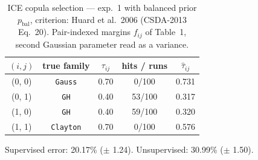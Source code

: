 \begin{table}[htbp]
  \centering
  \caption{ICE copula selection — exp.\ 1 with balanced prior $p_{\text{bal}}$, criterion: Huard et al.\ 2006 (CSDA-2013 Eq.\ 20). Pair-indexed margins $f_{ij}$ of Table~1, second Gaussian parameter read as a variance.}
  \label{tab:exp3-exp1_bal_p__huard}
  \begin{tabular}{ccccc}
    \toprule
    $(i, j)$ & true family & $\tau_{ij}$ & hits / runs & $\hat\tau_{ij}$ \\
    \midrule
    (0, 0) & \texttt{Gauss} & 0.70 & 0/100 & 0.731 \\
    (0, 1) & \texttt{GH} & 0.40 & 53/100 & 0.317 \\
    (1, 0) & \texttt{GH} & 0.40 & 59/100 & 0.320 \\
    (1, 1) & \texttt{Clayton} & 0.70 & 0/100 & 0.576 \\
    \bottomrule
  \end{tabular}
  \par\smallskip Supervised error: 20.17\% ($\pm$ 1.24). Unsupervised: 30.99\% ($\pm$ 1.50).
\end{table}
